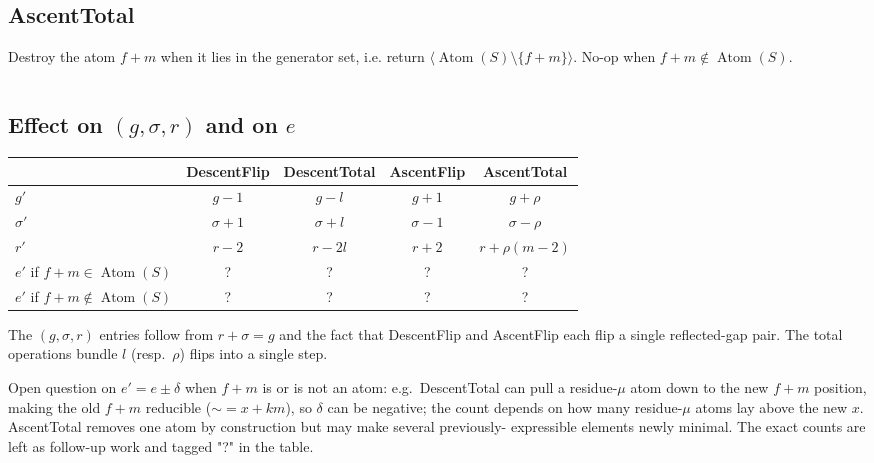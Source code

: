 \documentclass[11pt, a4paper]{article}
\begin{document}
\inputminted[firstline=209,lastline=239]{rust}{../crates/semigroup_math/src/math/manipulators.rs}

\subsection{AscentTotal}
Destroy the atom $f + m$ when it lies in the generator set, i.e.
return $\langle \operatorname{Atom}(S) \setminus \{f+m\}\rangle$.
No-op when $f + m \notin \operatorname{Atom}(S)$.

\inputminted[firstline=172,lastline=179]{rust}{../crates/semigroup_math/src/math/manipulators.rs}

\subsection{Effect on $(g, \sigma, r)$ and on $e$}

\begin{center}
\begin{tabular}{lcccc}
\toprule
                & DescentFlip & DescentTotal & AscentFlip & AscentTotal \\
\midrule
$g'$            & $g - 1$            & $g - l$            & $g + 1$            & $g + \rho$            \\
$\sigma'$       & $\sigma + 1$       & $\sigma + l$       & $\sigma - 1$       & $\sigma - \rho$       \\
$r'$            & $r - 2$            & $r - 2l$           & $r + 2$            & $r + \rho(m-2)$       \\
$e'$ if $f+m \in \operatorname{Atom}(S)$
                & ?                  & ?                  & ?                  & ?                     \\
$e'$ if $f+m \notin \operatorname{Atom}(S)$
                & ?                  & ?                  & ?                  & ?                     \\
\bottomrule
\end{tabular}
\end{center}

The $(g, \sigma, r)$ entries follow from $r + \sigma = g$ and the
fact that DescentFlip and AscentFlip each flip a single reflected-gap
pair. The total operations bundle $l$ (resp.\ $\rho$) flips into a
single step.

Open question on $e' = e \pm \delta$ when $f + m$ is or is not an
atom: e.g.\ DescentTotal can pull a residue-$\mu$ atom down to the
new $f + m$ position, making the old $f + m$ reducible
(${\sim} = x + km$), so $\delta$ can be negative; the count depends on
how many residue-$\mu$ atoms lay above the new $x$. AscentTotal
removes one atom by construction but may make several previously-
expressible elements newly minimal. The exact counts are left as
follow-up work and tagged "?" in the table.
\end{document}

